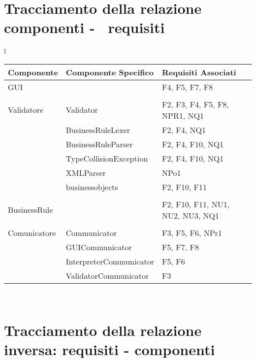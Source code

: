 \section{Tracciamento della relazione componenti - ~requisiti}
\begin{center}
\large{
\begin{tabular}{l}
\begin{tabular}{||p{2.6cm}||p{4.6cm}||p{2.8cm}||} \hline
\textbf{Componente} & \textbf{Componente Specifico} & \textbf{Requisiti Associati} \\ \hline

GUI & & F4, F5, F7, F8\\ \hline
 &  & \\ \hline

Validatore & Validator & F2, F3, F4, F5, F8, NPR1, NQ1\\ \hline
 & BusinessRuleLexer & F2, F4, NQ1 \\ \hline
 & BusinessRuleParser & F2, F4, F10, NQ1 \\ \hline
 & TypeCollisionException & F2, F4, F10, NQ1\\ \hline
 & XMLParser & NPo1\\ \hline
 & businessobjects & F2, F10, F11\\ \hline
 &  & \\ \hline

BusinessRule & & F2, F10, F11, NU1, NU2, NU3, NQ1\\ \hline
 &  & \\ \hline

Comunicatore & Communicator & F3, F5, F6, NPr1\\ \hline
 & GUICommunicator & F5, F7, F8\\ \hline
 & InterpreterCommunicator & F5, F6\\ \hline
 & ValidatorCommunicator & F3\\ \hline

\end{tabular} \\
\end{tabular}

}
\end{center}


\section{Tracciamento della relazione inversa: requisiti - componenti}

